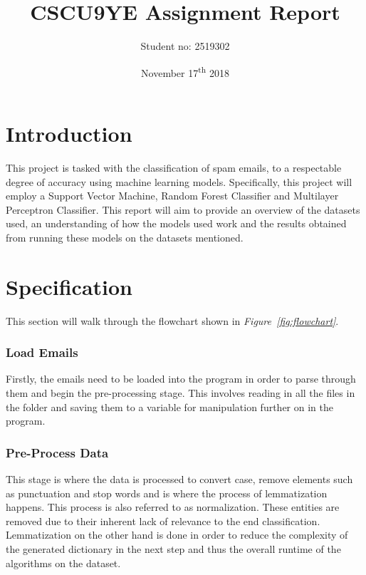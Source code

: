 \documentclass[11pt, a4paper]{article}
\title{CSCU9YE Assignment Report}
\author{Student no: 2519302}
\date{November 17\textsuperscript{th} 2018}
\begin{document}
\begin{titlepage}
\maketitle
\clearpage\thispagestyle{empty}
\end{titlepage}
\doublespacing
{}
\tableofcontents
\thispagestyle{empty}
\newpage
\singlespacing

\section{Introduction}

This project is tasked with the classification of spam emails, to a respectable degree of accuracy using machine learning models. Specifically, this project will employ a Support Vector Machine, Random Forest Classifier and Multilayer Perceptron Classifier. This report will aim to provide an overview of the datasets used, an understanding of how the models used work and the results obtained from running these models on the datasets mentioned.  

\section{Specification}

This section will walk through the flowchart shown in \emph{Figure~\ref{fig:flowchart}}.

\subsubsection*{Load Emails}

Firstly, the emails need to be loaded into the program in order to parse through them and begin the pre-processing stage. This involves reading in all the files in the folder and saving them to a variable for manipulation further on in the program. 

\subsubsection*{Pre-Process Data}

This stage is where the data is processed to convert case, remove elements such as punctuation and stop words and is where the process of lemmatization happens. This process is also referred to as normalization. These entities are removed due to their inherent lack of relevance to the end classification. Lemmatization on the other hand is done in order to reduce the complexity of the generated dictionary in the next step and thus  the overall runtime of the algorithms on the dataset.
\end{document}
